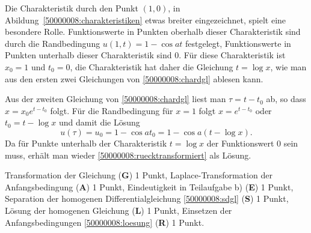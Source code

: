 \begin{diskussion}
Die Charakteristik durch den Punkt $(1,0)$, in Abildung~\ref{50000008:charakteristiken} etwas breiter eingezeichnet, spielt eine besondere Rolle.
Funktionswerte in Punkten oberhalb dieser Charakteristik sind durch die 
Randbedingung $u(1,t)=1-\cos at$ festgelegt, Funktionswerte in Punkten
unterhalb dieser Charakteristik sind $0$.
Für diese Charakteristik ist $x_0=1$ und $t_0=0$, die Charakteristik
hat daher die Gleichung $t=\log x$, wie man aus den ersten zwei Gleichungen
von \eqref{50000008:chardgl} ablesen kann.

Aus der zweiten Gleichung von \eqref{50000008:chardgl}
liest man $\tau=t-t_0$ ab, so dass 
$x=x_0e^{t-t_0}$ folgt.
Für die Randbedingung für $x=1$ folgt $x=e^{t-t_0}$
oder $t_0=t-\log x$ und damit die Lösung 
\[
u(\tau)=u_0=1-\cos at_0=1-\cos a(t-\log x).
\]
Da für Punkte unterhalb der Charakteristik $t=\log x$ der Funktionswert $0$
sein muss, erhält man wieder \eqref{50000008:ruecktransformiert} als Lösung.
\end{diskussion}

\begin{bewertung}
Transformation der Gleichung ({\bf G}) 1 Punkt,
Laplace-Transformation der Anfangsbedingung ({\bf A}) 1 Punkt,
Eindeutigkeit in Teilaufgabe b) ({\bf E}) 1 Punkt,
Separation der homogenen Differentialgleichung \eqref{50000008:sdgl}
({\bf S}) 1 Punkt,
Lösung der homogenen Gleichung ({\bf L}) 1 Punkt,
Einsetzen der Anfangsbedingungen \eqref{50000008:loesung} ({\bf R}) 1 Punkt.
\end{bewertung}
